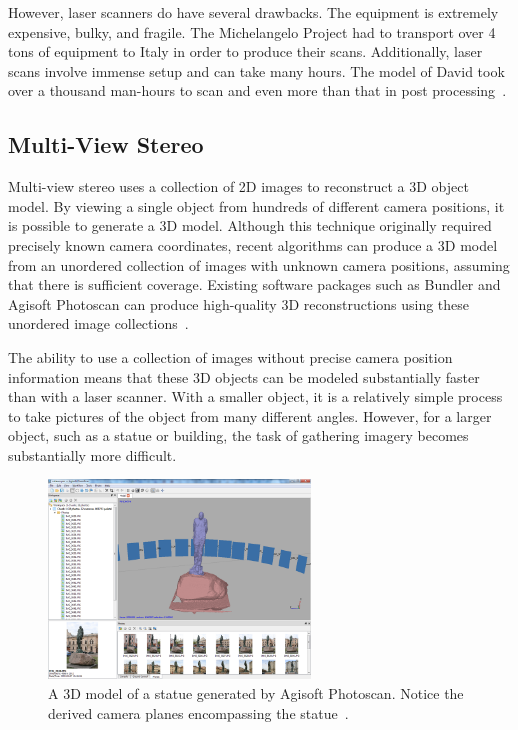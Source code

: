 However, laser scanners do have several drawbacks. The equipment is extremely expensive, bulky, and fragile. The Michelangelo Project had to transport over 4 tons of equipment to Italy in order to produce their scans. Additionally, laser scans involve immense setup and can take many hours. The model of David took over a thousand man-hours to scan and even more than that in post processing~\cite{Levoy}.

\subsection{Multi-View Stereo}
Multi-view stereo uses a collection of 2D images to reconstruct a 3D object model. By viewing a single object from hundreds of different camera positions, it is possible to generate a 3D model. Although this technique originally required precisely known camera coordinates, recent algorithms can produce a 3D model from an unordered collection of images with unknown camera positions, assuming that there is sufficient coverage. Existing software packages such as Bundler and Agisoft Photoscan can produce high-quality 3D reconstructions using these unordered image collections~\cite{bundler, Agisoft}.

The ability to use a collection of images without precise camera position information means that these 3D objects can be modeled substantially faster than with a laser scanner. With a smaller object, it is a relatively simple process to take pictures of the object from many different angles. However, for a larger object, such as a statue or building, the task of gathering imagery becomes substantially more difficult.

\begin{figure}
\centering
\includegraphics[height=200px]{../images/photoscan.png}
\caption{A 3D model of a statue generated by Agisoft Photoscan. Notice the derived camera planes encompassing the statue~\cite{Agisoft}.}
\end{figure}

